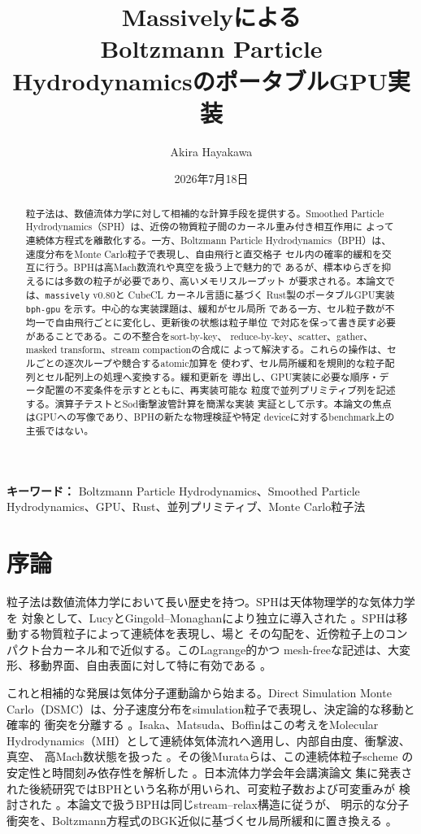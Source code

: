 \documentclass[a4paper,11pt]{ltjsarticle}
\title{Massivelyによる\\
Boltzmann Particle HydrodynamicsのポータブルGPU実装}
\author{Akira Hayakawa}
\date{2026年7月18日}
\newcommand{\bphgpu}{\texttt{bph-gpu}\xspace}
\newcommand{\massively}{\texttt{massively}\xspace}
\newcommand{\cubecl}{CubeCL\xspace}
\begin{document}
\maketitle

\begin{abstract}
粒子法は、数値流体力学に対して相補的な計算手段を提供する。Smoothed
Particle Hydrodynamics（SPH）は、近傍の物質粒子間のカーネル重み付き相互作用に
よって連続体方程式を離散化する。一方、Boltzmann Particle
Hydrodynamics（BPH）は、速度分布をMonte Carlo粒子で表現し、自由飛行と直交格子
セル内の確率的緩和を交互に行う。BPHは高Mach数流れや真空を扱う上で魅力的で
あるが、標本ゆらぎを抑えるには多数の粒子が必要であり、高いメモリスループット
が要求される。本論文では、\massively v0.80と \cubecl カーネル言語に基づく
Rust製のポータブルGPU実装 \bphgpu を示す。中心的な実装課題は、緩和がセル局所
である一方、セル粒子数が不均一で自由飛行ごとに変化し、更新後の状態は粒子単位
で対応を保って書き戻す必要があることである。この不整合をsort-by-key、
reduce-by-key、scatter、gather、masked transform、stream compactionの合成に
よって解決する。これらの操作は、セルごとの逐次ループや競合するatomic加算を
使わず、セル局所緩和を規則的な粒子配列とセル配列上の処理へ変換する。緩和更新を
導出し、GPU実装に必要な順序・データ配置の不変条件を示すとともに、再実装可能な
粒度で並列プリミティブ列を記述する。演算子テストとSod衝撃波管計算を簡潔な実装
実証として示す。本論文の焦点はGPUへの写像であり、BPHの新たな物理検証や特定
deviceに対するbenchmark上の主張ではない。
\end{abstract}

\begin{center}
\small
\textbf{キーワード：} Boltzmann Particle Hydrodynamics、Smoothed Particle
Hydrodynamics、GPU、Rust、並列プリミティブ、Monte Carlo粒子法
\end{center}

\section{序論}

粒子法は数値流体力学において長い歴史を持つ。SPHは天体物理学的な気体力学を
対象として、LucyとGingold--Monaghanにより独立に導入された
\cite{lucy1977,gingold1977}。SPHは移動する物質粒子によって連続体を表現し、場と
その勾配を、近傍粒子上のコンパクト台カーネル和で近似する。このLagrange的かつ
mesh-freeな記述は、大変形、移動界面、自由表面に対して特に有効である
\cite{monaghan1992}。

これと相補的な発展は気体分子運動論から始まる。Direct Simulation Monte
Carlo（DSMC）は、分子速度分布をsimulation粒子で表現し、決定論的な移動と確率的
衝突を分離する \cite{bird1994}。Isaka、Matsuda、Boffinはこの考えをMolecular
Hydrodynamics（MH）として連続体気体流れへ適用し、内部自由度、衝撃波、真空、
高Mach数状態を扱った \cite{isaka2006}。その後Murataらは、この連続体粒子scheme
の安定性と時間刻み依存性を解析した \cite{murata2008}。日本流体力学会年会講演論文
集に発表された後続研究ではBPHという名称が用いられ、可変粒子数および可変重みが
検討された \cite{isaka2010}。本論文で扱うBPHは同じstream--relax構造に従うが、
明示的な分子衝突を、Boltzmann方程式のBGK近似に基づくセル局所緩和に置き換える
\cite{bgk}。
\end{document}
